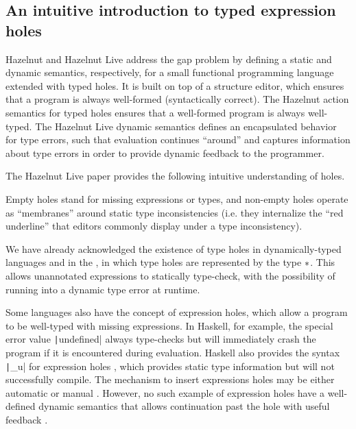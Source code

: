\subsection{An intuitive introduction to typed expression holes}
\label{sec:typed-holes}

Hazelnut and Hazelnut Live address the gap problem by defining a static and dynamic semantics, respectively, for a small functional programming language extended with typed holes. It is built on top of a structure editor, which ensures that a program is always well-formed (syntactically correct). The Hazelnut action semantics for typed holes ensures that a well-formed program is always well-typed. The Hazelnut Live dynamic semantics defines an encapsulated behavior for type errors, such that evaluation continues ``around'' and captures information about type errors in order to provide dynamic feedback to the programmer.

The Hazelnut Live paper provides the following intuitive understanding of holes.

\begin{displayquote}
  Empty holes stand for missing expressions or types, and non-empty holes operate as ``membranes''
around static type inconsistencies (i.e. they internalize the ``red underline'' that editors commonly display under a type inconsistency).
\end{displayquote}

We have already acknowledged the existence of type holes in dynamically-typed languages and in the \gtclc{}, in which type holes are represented by the type $*$. This allows unannotated expressions to statically type-check, with the possibility of running into a dynamic type error at runtime.

Some languages also have the concept of expression holes, which allow a program to be well-typed with missing expressions. In Haskell, for example, the special error value \texttt|undefined| always type-checks but will immediately crash the program if it is encountered during evaluation. Haskell also provides the syntax \texttt|_u| for expression holes , which provides static type information but will not successfully compile. The mechanism to insert expressions holes may be either automatic or manual . However, no such example of expression holes have a well-defined dynamic semantics that allows continuation past the hole with useful feedback .

